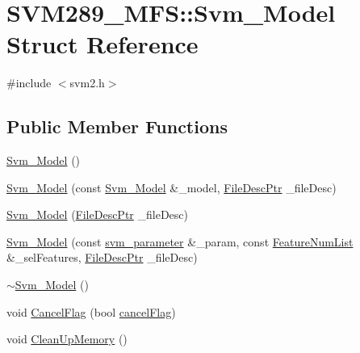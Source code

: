 \hypertarget{struct_s_v_m289___m_f_s_1_1_svm___model}{}\section{S\+V\+M289\+\_\+\+M\+FS\+:\+:Svm\+\_\+\+Model Struct Reference}
\label{struct_s_v_m289___m_f_s_1_1_svm___model}


{\ttfamily \#include $<$svm2.\+h$>$}

\subsection*{Public Member Functions}
\begin{DoxyCompactItemize}
\item 
\hyperlink{struct_s_v_m289___m_f_s_1_1_svm___model_adefa6ab195e26b6c9bebac37a20c6fb4}{Svm\+\_\+\+Model} ()
\item 
\hyperlink{struct_s_v_m289___m_f_s_1_1_svm___model_a56283eda05764386ab87856fe5e4640c}{Svm\+\_\+\+Model} (const \hyperlink{struct_s_v_m289___m_f_s_1_1_svm___model}{Svm\+\_\+\+Model} \&\+\_\+model, \hyperlink{namespace_k_k_m_l_l_aa0d0b6ab4ec18868a399b8455b05d914}{File\+Desc\+Ptr} \+\_\+file\+Desc)
\item 
\hyperlink{struct_s_v_m289___m_f_s_1_1_svm___model_ad7ca34377ca143791661cb80fd609450}{Svm\+\_\+\+Model} (\hyperlink{namespace_k_k_m_l_l_aa0d0b6ab4ec18868a399b8455b05d914}{File\+Desc\+Ptr} \+\_\+file\+Desc)
\item 
\hyperlink{struct_s_v_m289___m_f_s_1_1_svm___model_a98d755bfc9c1e83b467799cf7e3a12b6}{Svm\+\_\+\+Model} (const \hyperlink{struct_s_v_m289___m_f_s_1_1svm__parameter}{svm\+\_\+parameter} \&\+\_\+param, const \hyperlink{class_k_k_m_l_l_1_1_feature_num_list}{Feature\+Num\+List} \&\+\_\+sel\+Features, \hyperlink{namespace_k_k_m_l_l_aa0d0b6ab4ec18868a399b8455b05d914}{File\+Desc\+Ptr} \+\_\+file\+Desc)
\item 
\hyperlink{struct_s_v_m289___m_f_s_1_1_svm___model_ac07bd2d2d472c02c11f407a00b22c40e}{$\sim$\+Svm\+\_\+\+Model} ()
\item 
void \hyperlink{struct_s_v_m289___m_f_s_1_1_svm___model_a018038a6d50ceedc7a6690be30dd0b9e}{Cancel\+Flag} (bool \hyperlink{struct_s_v_m289___m_f_s_1_1_svm___model_a01645368f6800875543d69ce8731d692}{cancel\+Flag})
\item 
void \hyperlink{struct_s_v_m289___m_f_s_1_1_svm___model_a38e71bae1b5829f722cbcb19eb3930b1}{Clean\+Up\+Memory} ()

\end{DoxyCompactItemize}
